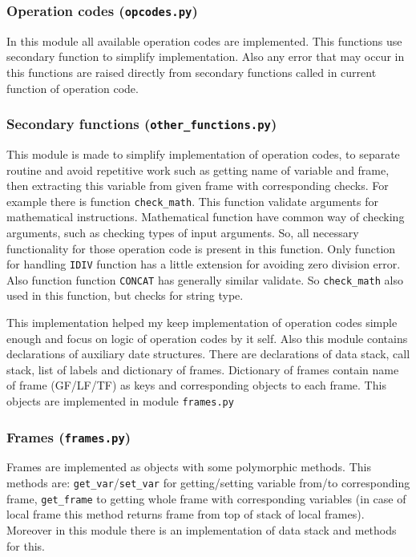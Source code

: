 \documentclass[10pt,a4paper]{article}
\begin{document}
\subsubsection{Operation codes (\texttt{opcodes.py})}

In this module all available operation codes are implemented. This functions
use secondary function to simplify implementation. Also any error that may occur 
in this functions are raised directly from secondary functions called in current 
function of operation code.  

\subsubsection{Secondary functions (\texttt{other\_functions.py})}

This module is made to simplify implementation of operation codes, to separate 
routine and avoid repetitive work such as getting name of variable and frame, 
then extracting this variable from given frame with corresponding checks. For 
example there is function \texttt{check\_math}. This function validate arguments 
for mathematical instructions. Mathematical function have common way of checking 
arguments, such as checking types of input arguments. So, all necessary 
functionality for those operation code is present in this function. Only 
function for handling \texttt{IDIV} function has a little extension for avoiding 
zero division error. Also function function \texttt{CONCAT} has generally 
similar validate. So \texttt{check\_math} also used in this function, but checks 
for string type.

This implementation helped my keep implementation of operation codes simple enough 
and focus on logic of operation codes by it self. Also this module contains 
declarations of auxiliary  date structures. There are declarations of data stack, 
call stack, list of labels and dictionary of frames. Dictionary of frames 
contain name of frame (GF/LF/TF) as keys and corresponding  objects to each frame. 
This objects are implemented in module \texttt{frames.py}

\subsubsection{Frames (\texttt{frames.py})}

Frames are implemented as objects with some polymorphic methods. This methods are: 
\texttt{get\_var}/\texttt{set\_var} for getting/setting variable from/to 
corresponding frame, \texttt{get\_frame} to getting whole frame with corresponding 
variables (in case of local frame this method returns frame from top of stack of 
local frames). Moreover in this module there is an implementation of data stack 
and methods for this.
\end{document}
